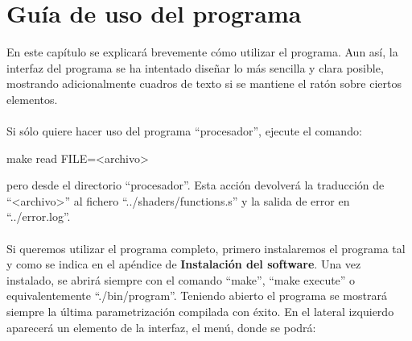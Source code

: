 
\chapter{Guía de uso del programa}\label{ap:apendice2}

En este capítulo se explicará brevemente cómo utilizar el programa. Aun así, la interfaz del programa se ha intentado diseñar lo más sencilla y clara posible, mostrando adicionalmente cuadros de texto si se mantiene el ratón sobre ciertos elementos.\\
\\Si sólo quiere hacer uso del programa ``procesador'', ejecute el comando:
\begin{center}
 make read FILE=<archivo>
\end{center}
pero desde el directorio ``procesador''. Esta acción devolverá la traducción de ``<archivo>'' al fichero ``../shaders/functions.s'' y la salida de error en ``../error.log''.\\
\\Si queremos utilizar el programa completo, primero instalaremos el programa tal y como se indica en el apéndice de \textbf{Instalación del software}. Una vez instalado, se abrirá siempre con el comando ``make'', ``make execute'' o equivalentemente ``./bin/program''. Teniendo abierto el programa se mostrará siempre la última parametrización compilada con éxito. En el lateral izquierdo aparecerá un elemento de la interfaz, el menú, donde se podrá:
